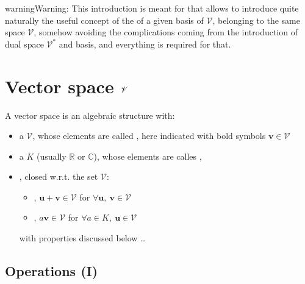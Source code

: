 \documentclass[letterpaper,10pt,english]{jupyterBook}
\begin{document}
\begin{sphinxadmonition}{warning}{Warning:}
\sphinxAtStartPar
This introduction is meant for  that allows to introduce quite naturally the useful concept of the  of a given basis of \(\mathscr{V}\), belonging to the same space \(\mathscr{V}\), somehow avoiding the complications coming from the introduction of dual space \(\mathscr{V}^*\) and basis, and everything is required for that.
\end{sphinxadmonition}


\section{Vector space \protect\(\mathscr{V}\protect\)}
\label{\detokenize{ch/tensor-algebra-calculus/algebra:vector-space-mathscr-v}}
\sphinxAtStartPar
A vector space is an algebraic structure with:
\begin{itemize}
\item {} 
\sphinxAtStartPar
a  \(\mathscr{V}\), whose elements are called , here indicated with bold symbols \(\mathbf{v} \in \mathscr{V}\)

\item {} 
\sphinxAtStartPar
a  \(K\) (usually \(\mathbb{R}\) or \(\mathbb{C}\)), whose elements are calles ,

\item {} 
 , closed w.r.t. the set \(\mathscr{V}\):
\begin{itemize}
\item {} 
\sphinxAtStartPar
{}, \(\mathbf{u} + \mathbf{v} \in \mathscr{V}\) for  \(\forall \mathbf{u}, \ \mathbf{v} \in \mathscr{V}\)

\item {} 
\sphinxAtStartPar
{}, \(a \mathbf{v} \in \mathscr{V}\) for \(\forall a \in K, \ \mathbf{u} \in \mathscr{V}\)

\end{itemize}

\sphinxAtStartPar
with properties discussed below 
…

\end{itemize}


\subsection{Operations (I)}
\label{\detokenize{ch/tensor-algebra-calculus/algebra:operations-i}}
\end{document}

